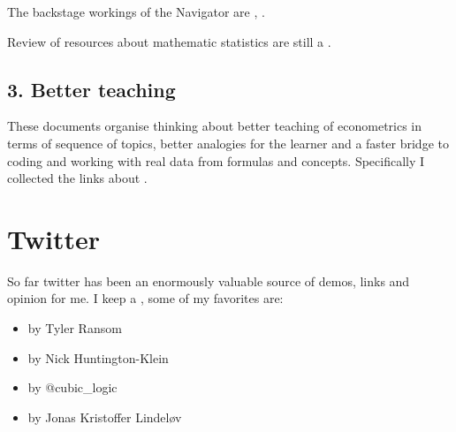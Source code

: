 \documentclass[letterpaper,10pt,english]{sphinxmanual}
\begin{document}
The backstage workings of the Navigator are ,
.

Review of resources about mathematic statistics are still a .


\subsection{3. Better teaching}
\label{\detokenize{index:better-teaching}}
These documents organise thinking about better teaching of
econometrics in terms of sequence of topics, better analogies
for the learner and a faster bridge to coding and working
with real data from formulas and concepts. Specifically I collected
the links about .


\section{Twitter}
\label{\detokenize{index:twitter}}
So far twitter has been an enormously valuable source of demos, links and opinion for me.
I keep a , some of my favorites are:
\begin{itemize}
\item {} 
 by Tyler Ransom

\end{itemize}


\begin{itemize}
\item {} 
 by Nick Huntington-Klein

\end{itemize}


\begin{itemize}
\item {} 
 by @cubic\_logic

\end{itemize}


\begin{itemize}
\item {} 
 by Jonas Kristoffer Lindeløv

\end{itemize}
\end{document}

